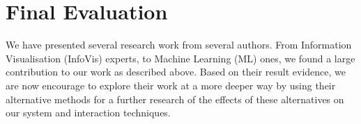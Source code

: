 \section{Final Evaluation}

We have presented several research work from several authors. From Information Visualisation (InfoVis) experts, to Machine Learning (ML) ones, we found a large contribution to our work as described above. Based on their result evidence, we are now encourage to explore their work at a more deeper way by using their alternative methods for a further research of the effects of these alternatives on our system and interaction techniques.